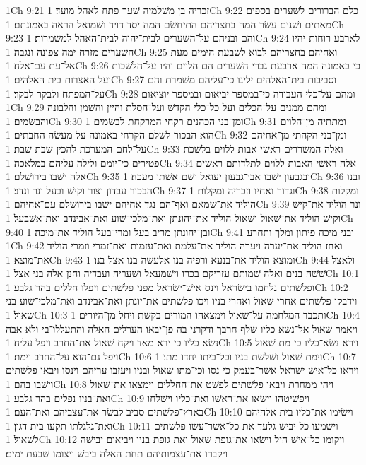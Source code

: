 1Ch 9:21  זכריה בן משׁלמיה שׁער פתח לאהל מועד׃
1Ch 9:22  כלם הברורים לשׁערים בספים מאתים ושׁנים עשׂר המה בחצריהם התיחשׂם המה יסד דויד ושׁמואל הראה באמונתם׃
1Ch 9:23  והם ובניהם על־השׁערים לבית־יהוה לבית־האהל למשׁמרות׃
1Ch 9:24  לארבע רוחות יהיו השׁערים מזרח ימה צפונה ונגבה׃
1Ch 9:25  ואחיהם בחצריהם לבוא לשׁבעת הימים מעת אל־עת עם־אלה׃
1Ch 9:26  כי באמונה המה ארבעת גברי השׁערים הם הלוים והיו על־הלשׁכות ועל האצרות בית האלהים׃
1Ch 9:27  וסביבות בית־האלהים ילינו כי־עליהם משׁמרת והם על־המפתח ולבקר לבקר׃
1Ch 9:28  ומהם על־כלי העבודה כי־במספר יביאום ובמספר יוציאום׃
1Ch 9:29  ומהם ממנים על־הכלים ועל כל־כלי הקדשׁ ועל־הסלת והיין והשׁמן והלבונה והבשׂמים׃
1Ch 9:30  ומן־בני הכהנים רקחי המרקחת לבשׂמים׃
1Ch 9:31  ומתתיה מן־הלוים הוא הבכור לשׁלם הקרחי באמונה על מעשׂה החבתים׃
1Ch 9:32  ומן־בני הקהתי מן־אחיהם על־לחם המערכת להכין שׁבת שׁבת׃
1Ch 9:33  ואלה המשׁררים ראשׁי אבות ללוים בלשׁכת פטירים כי־יומם ולילה עליהם במלאכה׃
1Ch 9:34  אלה ראשׁי האבות ללוים לתלדותם ראשׁים אלה ישׁבו בירושׁלם׃
1Ch 9:35  ובגבעון ישׁבו אבי־גבעון יעואל ושׁם אשׁתו מעכה׃
1Ch 9:36  ובנו הבכור עבדון וצור וקישׁ ובעל ונר ונדב׃
1Ch 9:37  וגדור ואחיו וזכריה ומקלות׃
1Ch 9:38  ומקלות הוליד את־שׁמאם ואף־הם נגד אחיהם ישׁבו בירושׁלם עם־אחיהם׃
1Ch 9:39  ונר הוליד את־קישׁ וקישׁ הוליד את־שׁאול ושׁאול הוליד את־יהונתן ואת־מלכי־שׁוע ואת־אבינדב ואת־אשׁבעל׃
1Ch 9:40  ובן־יהונתן מריב בעל ומרי־בעל הוליד את־מיכה׃
1Ch 9:41  ובני מיכה פיתון ומלך ותחרע׃
1Ch 9:42  ואחז הוליד את־יערה ויערה הוליד את־עלמת ואת־עזמות ואת־זמרי וזמרי הוליד את־מוצא׃
1Ch 9:43  ומוצא הוליד את־בנעא ורפיה בנו אלעשׂה בנו אצל בנו׃
1Ch 9:44  ולאצל שׁשׁה בנים ואלה שׁמותם עזריקם בכרו וישׁמעאל ושׁעריה ועבדיה וחנן אלה בני אצל׃
1Ch 10:1  ופלשׁתים נלחמו בישׂראל וינס אישׁ־ישׂראל מפני פלשׁתים ויפלו חללים בהר גלבע׃
1Ch 10:2  וידבקו פלשׁתים אחרי שׁאול ואחרי בניו ויכו פלשׁתים את־יונתן ואת־אבינדב ואת־מלכי־שׁוע בני שׁאול׃
1Ch 10:3  ותכבד המלחמה על־שׁאול וימצאהו המורים בקשׁת ויחל מן־היורים׃
1Ch 10:4  ויאמר שׁאול אל־נשׂא כליו שׁלף חרבך ודקרני בה פן־יבאו הערלים האלה והתעללו־בי ולא אבה נשׂא כליו כי ירא מאד ויקח שׁאול את־החרב ויפל עליה׃
1Ch 10:5  וירא נשׂא־כליו כי מת שׁאול ויפל גם־הוא על־החרב וימת׃
1Ch 10:6  וימת שׁאול ושׁלשׁת בניו וכל־ביתו יחדו מתו׃
1Ch 10:7  ויראו כל־אישׁ ישׂראל אשׁר־בעמק כי נסו וכי־מתו שׁאול ובניו ויעזבו עריהם וינסו ויבאו פלשׁתים וישׁבו בהם׃
1Ch 10:8  ויהי ממחרת ויבאו פלשׁתים לפשׁט את־החללים וימצאו את־שׁאול ואת־בניו נפלים בהר גלבע׃
1Ch 10:9  ויפשׁיטהו וישׂאו את־ראשׁו ואת־כליו וישׁלחו בארץ־פלשׁתים סביב לבשׂר את־עצביהם ואת־העם׃
1Ch 10:10  וישׂימו את־כליו בית אלהיהם ואת־גלגלתו תקעו בית דגון׃
1Ch 10:11  וישׁמעו כל יבישׁ גלעד את כל־אשׁר־עשׂו פלשׁתים לשׁאול׃
1Ch 10:12  ויקומו כל־אישׁ חיל וישׂאו את־גופת שׁאול ואת גופת בניו ויביאום יבישׁה ויקברו את־עצמותיהם תחת האלה ביבשׁ ויצומו שׁבעת ימים׃
